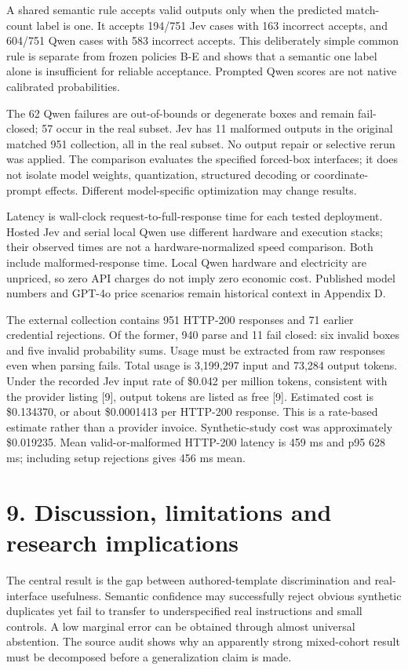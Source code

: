 \documentclass[10pt]{article}
\begin{document}
A shared semantic rule accepts valid outputs only when the predicted match-count label is one. It accepts 194/751 Jev cases with 163 incorrect accepts, and 604/751 Qwen cases with 583 incorrect accepts. This deliberately simple common rule is separate from frozen policies B-E and shows that a semantic one label alone is insufficient for reliable acceptance. Prompted Qwen scores are not native calibrated probabilities.

The 62 Qwen failures are out-of-bounds or degenerate boxes and remain fail-closed; 57 occur in the real subset. Jev has 11 malformed outputs in the original matched 951 collection, all in the real subset. No output repair or selective rerun was applied. The comparison evaluates the specified forced-box interfaces; it does not isolate model weights, quantization, structured decoding or coordinate-prompt effects. Different model-specific optimization may change results.

Latency is wall-clock request-to-full-response time for each tested deployment. Hosted Jev and serial local Qwen use different hardware and execution stacks; their observed times are not a hardware-normalized speed comparison. Both include malformed-response time. Local Qwen hardware and electricity are unpriced, so zero API charges do not imply zero economic cost. Published model numbers and GPT-4o price scenarios remain historical context in Appendix D.

The external collection contains 951 HTTP-200 responses and 71 earlier credential rejections. Of the former, 940 parse and 11 fail closed: six invalid boxes and five invalid probability sums. Usage must be extracted from raw responses even when parsing fails. Total usage is 3,199,297 input and 73,284 output tokens. Under the recorded Jev input rate of \$0.042 per million tokens, consistent with the provider listing [9], output tokens are listed as free [9]. Estimated cost is \$0.134370, or about \$0.0001413 per HTTP-200 response. This is a rate-based estimate rather than a provider invoice. Synthetic-study cost was approximately \$0.019235. Mean valid-or-malformed HTTP-200 latency is 459 ms and p95 628 ms; including setup rejections gives 456 ms mean.

\section*{9. Discussion, limitations and research implications}
The central result is the gap between authored-template discrimination and real-interface usefulness. Semantic confidence may successfully reject obvious synthetic duplicates yet fail to transfer to underspecified real instructions and small controls. A low marginal error can be obtained through almost universal abstention. The source audit shows why an apparently strong mixed-cohort result must be decomposed before a generalization claim is made.
\end{document}

